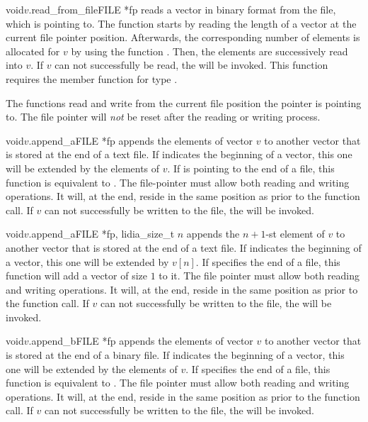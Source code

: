 \begin{fcode}{void}{$v$.read_from_file}{FILE *fp}
  reads a vector in binary format from the file, which  is pointing to.  The function starts
  by reading the length of a vector at the current file pointer position.  Afterwards, the
  corresponding number of elements is allocated for $v$ by using the function
  .  Then, the elements are successively read into $v$.  If $v$ can not
  successfully be read, the \LEH will be invoked.  This function requires the member function
   for type .
\end{fcode}

The functions read and write from the current file position the pointer is pointing to.  The file
pointer will \emph{not} be reset after the reading or writing process.

\begin{cfcode}{void}{$v$.append_a}{FILE *fp}
  appends the elements of vector $v$ to another vector that is stored at the end of a text file.
  If  indicates the beginning of a vector, this one will be extended by the elements of $v$.
  If  is pointing to the end of a file, this function is equivalent to
  .  The file-pointer must allow both reading and writing operations.  It
  will, at the end, reside in the same position as prior to the function call.  If $v$ can not
  successfully be written to the file, the \LEH will be invoked.
\end{cfcode}

\begin{cfcode}{void}{$v$.append_a}{FILE *fp, lidia_size_t $n$}
  appends the $n+1$-st element of $v$ to another vector that is stored at the end of a text
  file.  If  indicates the beginning of a vector, this one will be extended by $v[n]$.
  If  specifies the end of a file, this function will add a vector of size $1$ to it.  The
  file pointer must allow both reading and writing operations.  It will, at the end, reside in
  the same position as prior to the function call.  If $v$ can not successfully be written to the
  file, the \LEH will be invoked.
\end{cfcode}

\begin{cfcode}{void}{$v$.append_b}{FILE *fp}
  appends the elements of vector $v$ to another vector that is stored at the end of a binary
  file.  If  indicates the beginning of a vector, this one will be extended by the elements
  of $v$.  If  specifies the end of a file, this function is equivalent to
  .  The file pointer must allow both reading and writing operations.  It
  will, at the end, reside in the same position as prior to the function call.  If $v$ can not
  successfully be written to the file, the \LEH will be invoked.
\end{cfcode}


